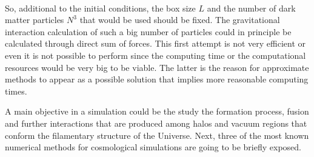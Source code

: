 \

So, additional to the initial conditions, the box size $L$ and the number of 
dark matter particles $N^3$ that would be used should be fixed. 
The gravitational interaction calculation of such a big number of particles
could in principle be calculated through direct sum of forces. This first
attempt is not very efficient or even it is not possible to perform
since the computing time or the computational resources would be very 
big to be viable. The latter is the reason for approximate methods 
to appear as a possible solution that implies more reasonable computing times.

A main objective in a simulation could be the study the formation process, fusion and
further interactions that are produced among halos and vacuum regions that conform
the filamentary structure of the Universe. Next, three of the most known numerical 
methods for cosmological simulations are going to be briefly exposed.

